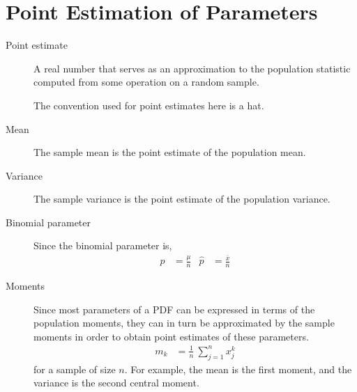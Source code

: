 \section{Point Estimation of Parameters}

\begin{description}
    \item[Point estimate] A real number that serves as an approximation to the population
          statistic computed from some operation on a random sample. \par
          The convention used for point estimates here is a hat.

    \item[Mean] The sample mean is the point estimate of the population mean.

    \item[Variance] The sample variance is the point estimate of the population variance.

    \item[Binomial parameter] Since the binomial parameter is,
          \begin{align}
              p & = \frac{\mu}{n} & \hat{p} & = \frac{\bar{x}}{n}
          \end{align}

    \item[Moments] Since most parameters of a PDF can be expressed in terms of the
          population moments, they can in turn be approximated by the sample moments in
          order to obtain point estimates of these parameters.
          \begin{align}
              m_k & = \frac{1}{n}\ \sum_{j=1}^{n} x_j^k
          \end{align}
          for a sample of size $ n $. For example, the mean is the first moment, and
          the variance is the second central moment.


\end{description}
